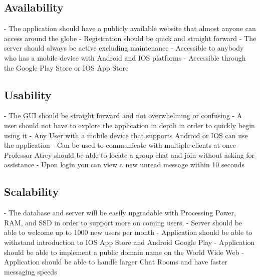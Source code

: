 \documentclass[11pt]{article}
\theoremstyle{plain}
\theoremstyle{definition}
\begin{document}
  
\subsection{Availability}
- The application should have a publicly available website that almost anyone can access 
  around the globe \newline
- Registration should be quick and straight forward \newline
- The server should always be active excluding maintenance \newline
- Accessible to anybody who has a mobile device with Android and IOS platforms \newline
- Accessible through the Google Play Store or IOS App Store \newline

\subsection{Usability}
- The GUI should be straight forward and not overwhelming or confusing  \newline
- A user should not have to explore the application in depth in order to quickly begin using it  \newline
- Any User with a mobile device that supports Android or IOS can use the application \newline
- Can be used to communicate with multiple clients at once \newline
- Professor Atrey should be able to locate a group chat and join without asking for assistance \newline
- Upon login you can view a new unread message within 10 seconds \newline


\subsection{Scalability}
- The database and server will be easily upgradable with Processing Power, RAM, and SSD in order to support more on coming users.   \newline
- Server should be able to welcome up to 1000 new users per month \newline
- Application should be able to withstand introduction to IOS App Store and Android Google Play \newline
- Application should be able to implement a public domain name on the World Wide Web \newline
- Application should be able to handle larger Chat Rooms and have faster messaging speeds \newline
\end{document}
